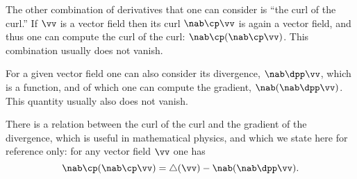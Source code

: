 The other combination of derivatives that one can consider is ``the curl of the
curl.''  If $\vv$ is a vector field then its curl $\nab\cp\vv$ is again a vector
field, and thus one can compute the curl of the curl: $\nab\cp(\nab\cp\vv)$.
This combination usually does not vanish.

For a given vector field one can also consider its divergence, $\nab\dpp\vv$,
which is a function, and of which one can compute the gradient,
$\nab(\nab\dpp\vv)$.  This quantity usually also does not vanish.

There is a relation between the curl of the curl and the gradient of the
divergence, which is useful in mathematical physics, and which we state here for
reference only: for any vector field $\vv$ one has
\[
\nab\cp(\nab\cp\vv) = \triangle(\vv) - \nab(\nab\dpp\vv).
\]

